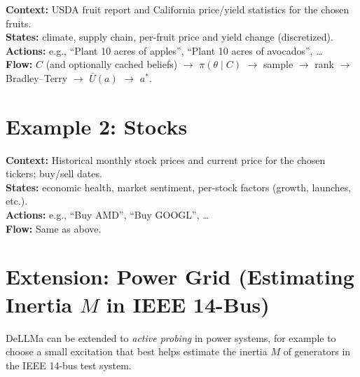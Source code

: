 \documentclass[11pt]{article}
\begin{document}
\textbf{Context:} USDA fruit report and California price/yield statistics for the chosen fruits. \\
\textbf{States:} climate, supply chain, per-fruit price and yield change (discretized). \\
\textbf{Actions:} e.g., ``Plant 10 acres of apples'', ``Plant 10 acres of avocados'', \ldots \\
\textbf{Flow:} $C$ (and optionally cached beliefs) $\to$ $\pi(\theta\mid C)$ $\to$ sample $\to$ rank $\to$ Bradley--Terry $\to$ $\bar{U}(a)$ $\to$ $a^*$.

\section{Example 2: Stocks}

\textbf{Context:} Historical monthly stock prices and current price for the chosen tickers; buy/sell dates. \\
\textbf{States:} economic health, market sentiment, per-stock factors (growth, launches, etc.). \\
\textbf{Actions:} e.g., ``Buy AMD'', ``Buy GOOGL'', \ldots \\
\textbf{Flow:} Same as above.

\section{Extension: Power Grid (Estimating Inertia $M$ in IEEE 14-Bus)}

DeLLMa can be extended to \emph{active probing} in power systems, for example to choose a small excitation that best helps estimate the inertia $M$ of generators in the IEEE 14-bus test system.
\end{document}
